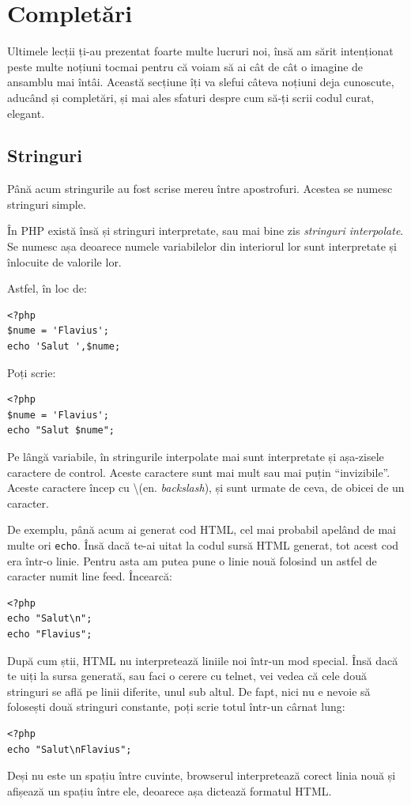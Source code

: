 \section{Completări}
Ultimele lecții ți-au prezentat foarte multe
lucruri noi, însă am sărit intenționat peste multe
noțiuni tocmai pentru că voiam să ai cât de cât
o imagine de ansamblu mai întâi. Această secțiune îți
va slefui câteva noțiuni deja cunoscute, aducând
și completări, și mai ales sfaturi despre
cum să-ți scrii codul curat, elegant.


\subsection{Stringuri}
Până acum stringurile au fost scrise mereu
între apostrofuri. Acestea se numesc stringuri simple.

În PHP există însă și stringuri interpretate,
sau mai bine zis \textsl{stringuri interpolate}. Se numesc
așa deoarece numele variabilelor din interiorul lor
sunt interpretate și înlocuite de valorile lor.

Astfel, în loc de:
\begin{lstlisting}
<?php
$nume = 'Flavius';
echo 'Salut ',$nume;
\end{lstlisting}
Poți scrie:
\begin{lstlisting}
<?php
$nume = 'Flavius';
echo "Salut $nume";
\end{lstlisting}

Pe lângă variabile, în stringurile interpolate
mai sunt interpretate și
așa-zisele caractere de control. Aceste caractere
sunt mai mult sau mai puțin ``invizibile''. Aceste
caractere încep cu \textbackslash (en. \textsl{backslash}),
și sunt urmate de ceva, de obicei de un caracter.

De exemplu, până acum ai generat cod HTML,
cel mai probabil apelând de mai multe ori
\texttt{echo}. Însă dacă te-ai uitat la codul
sursă HTML generat, tot acest cod era într-o linie.
Pentru asta am putea pune o linie nouă folosind un astfel
de caracter numit line feed. Încearcă:
\begin{lstlisting}
<?php
echo "Salut\n";
echo "Flavius";
\end{lstlisting}
După cum știi, HTML nu interpretează liniile noi într-un mod
special.  Însă dacă te uiți la sursa generată, sau faci
o cerere cu telnet, vei vedea că cele două stringuri 
se află pe linii diferite, unul sub altul. De fapt, nici
nu e nevoie să folosești două stringuri constante, poți
scrie totul într-un cârnat lung:
\begin{lstlisting}
<?php
echo "Salut\nFlavius";
\end{lstlisting}
Deși nu este un spațiu între cuvinte, browserul interpretează
corect linia nouă și afișează un spațiu între ele, deoarece
așa dictează formatul HTML.

